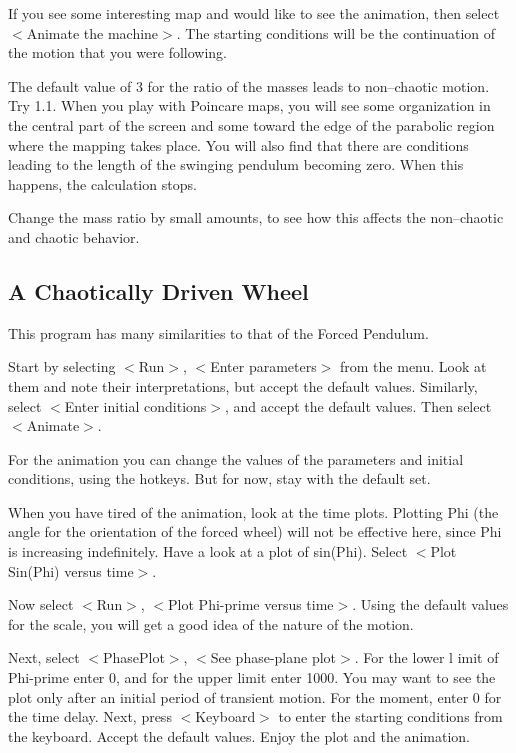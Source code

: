    If you see some interesting map and would like to see the animation,
then select $<$Animate the machine$>$. The starting conditions will be the
continuation of the motion that you were following.

   The default value of 3 for the ratio of the masses leads to non--chaotic
motion. Try 1.1. When you play with Poincare maps, you will see some
organization in the central part of the screen and some toward the edge
of the parabolic region where the mapping takes place. You will also
find that there are conditions leading to the length of the swinging
pendulum becoming zero. When this happens, the calculation stops.

   Change the mass ratio by small amounts, to see how this affects the
non--chaotic and chaotic behavior.



\subsection{A Chaotically Driven Wheel}

   This program has many similarities to that of the Forced Pendulum.

   Start by selecting $<$Run$>$, $<$Enter parameters$>$ from the menu. Look at
them and note their interpretations, but accept the default values.
Similarly, select $<$Enter initial conditions$>$, and accept the default
values. Then select $<$Animate$>$.

   For the animation you can change the values of the parameters and
initial conditions, using the hotkeys. But for now, stay with the
default set.

   When you have tired of the animation, look at the time plots.
Plotting Phi (the angle for the orientation of the forced wheel) will
not be effective here, since Phi is increasing indefinitely. Have a
look at a plot of sin(Phi). Select $<$Plot Sin(Phi) versus time$>$.

   Now select $<$Run$>$, $<$Plot Phi-prime versus time$>$. Using the default
values for the scale, you will get a good idea of the nature of the
motion.

   Next, select $<$PhasePlot$>$, $<$See phase-plane plot$>$. For the lower l
imit of Phi-prime enter 0, and for the upper limit enter 1000. You may
want to see the plot only after an initial period of transient motion.
For the moment, enter 0 for the time delay. Next, press $<$Keyboard$>$ to
enter the starting conditions from the keyboard. Accept the default values.
Enjoy the plot and the animation.


